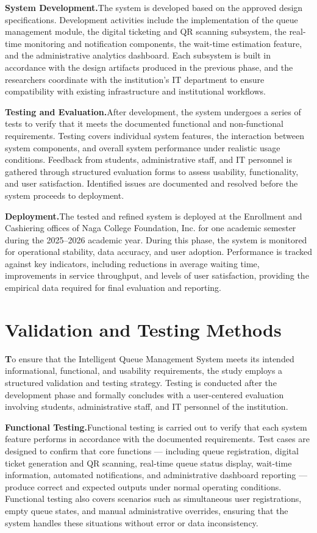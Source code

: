 \documentclass{research}
\begin{document}
\indent\textbf{System Development.}The system is developed based on the approved design specifications. Development
activities include the implementation of the queue management module, the
digital ticketing and QR scanning subsystem, the real-time monitoring and
notification components, the wait-time estimation feature, and the
administrative analytics dashboard. Each subsystem is built in accordance
with the design artifacts produced in the previous phase, and the researchers
coordinate with the institution's IT department to ensure compatibility with
existing infrastructure and institutional workflows.
 
\indent\textbf{Testing and Evaluation.}After development, the system undergoes a series of tests to verify that it
meets the documented functional and non-functional requirements. Testing
covers individual system features, the interaction between system components,
and overall system performance under realistic usage conditions. Feedback
from students, administrative staff, and IT personnel is gathered through
structured evaluation forms to assess usability, functionality, and user
satisfaction. Identified issues are documented and resolved before the system
proceeds to deployment.
 
\indent\textbf{Deployment.}The tested and refined system is deployed at the Enrollment and Cashiering
offices of Naga College Foundation, Inc. for one academic semester during
the 2025--2026 academic year. During this phase, the system is monitored
for operational stability, data accuracy, and user adoption. Performance is
tracked against key indicators, including reductions in average waiting time,
improvements in service throughput, and levels of user satisfaction,
providing the empirical data required for final evaluation and reporting.

\section{Validation and Testing Methods}

\indent\textbf To ensure that the Intelligent Queue Management System meets its intended
informational, functional, and usability requirements, the study employs a
structured validation and testing strategy. Testing is conducted after the
development phase and formally concludes with a user-centered evaluation
involving students, administrative staff, and IT personnel of the institution.
 
\indent\textbf{Functional Testing.}Functional testing is carried out to verify that each system feature performs
in accordance with the documented requirements. Test cases are designed to
confirm that core functions --- including queue registration, digital ticket
generation and QR scanning, real-time queue status display, wait-time
information, automated notifications, and administrative dashboard reporting
--- produce correct and expected outputs under normal operating conditions.
Functional testing also covers scenarios such as simultaneous user
registrations, empty queue states, and manual administrative overrides,
ensuring that the system handles these situations without error or data
inconsistency.
 
\end{document}

